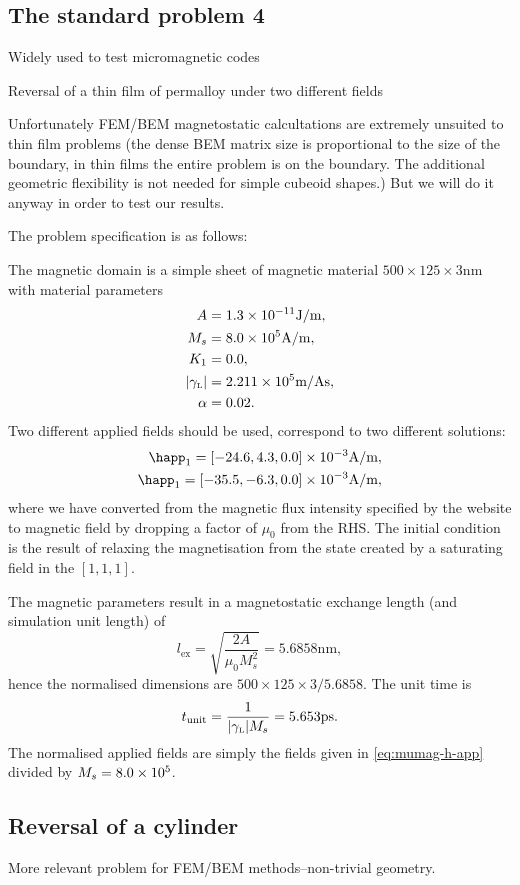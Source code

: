 \subsection{The \mumag standard problem 4}

Widely used to test micromagnetic codes

Reversal of a thin film of permalloy under two different fields

Unfortunately FEM/BEM magnetostatic calcultations are extremely unsuited to thin film problems (the dense BEM matrix size is proportional to the size of the boundary, in thin films the entire problem is on the boundary. The additional geometric flexibility is not needed for simple cubeoid shapes.)
But we will do it anyway in order to test our results.

The problem specification is as follows:

The magnetic domain is a simple sheet of magnetic material $500 \times 125 \times 3$nm with material parameters
\begin{equation}
  \begin{aligned}
    A &= 1.3\times 10^{-11} \text{J/m}, \\
    M_s &= 8.0\times 10^{5} \text{A/m}, \\
    K_1 &= 0.0, \\
    {\left|{\gamma_{\text{\tiny{L}}}} \right|} &= 2.211 \times 10^{5} \text{m/As}, \\
    \alpha &= 0.02.
  \end{aligned}
\end{equation}
Two different applied fields should be used, correspond to two different solutions:
\begin{equation}
  \begin{aligned}
    \happ_1 = [-24.6, 4.3, 0.0] \E{-3}\text{A/m}, \\
    \happ_1 = [-35.5, -6.3, 0.0] \E{-3}\text{A/m}, \\
  \end{aligned}
\label{eq:mumag-h-app}
\end{equation}
where we have converted from the magnetic flux intensity specified by the \mumag website to magnetic field by dropping a factor of $\mu_0$ from the RHS.
The initial condition is the result of relaxing the magnetisation from the state created by a saturating field in the $[1,1,1]$.

The magnetic parameters result in a magnetostatic exchange length (and simulation unit length) of
\begin{equation}
  l_{\text{ex}} = \sqrt{\frac{2A}{\mu_0 M_s^2}} = 5.6858\text{nm},
\end{equation}
hence the normalised dimensions are $500 \times 125 \times 3 / 5.6858$.
The unit time is
\begin{equation}
  t_{\text{unit}} = \frac{1}{{\left|{\gamma_{\text{\tiny{L}}}} \right|} M_s} = 5.653\text{ps}.
\end{equation}
The normalised applied fields are simply the fields given in \cref{eq:mumag-h-app} divided by $M_s = 8.0\times 10^{5}$.


\subsection{Reversal of a cylinder}

More relevant problem for FEM/BEM methods--non-trivial geometry.






